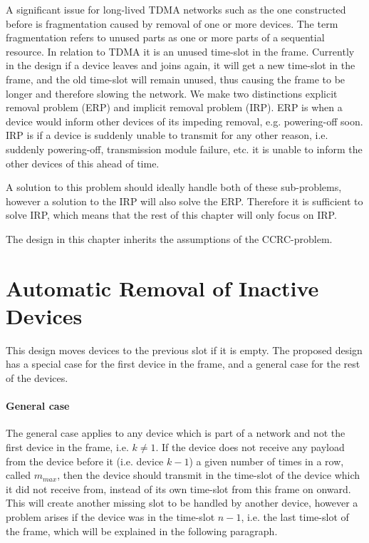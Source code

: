 A significant issue for long-lived TDMA networks such as the one constructed before is fragmentation caused by removal of one or more devices. 
The term fragmentation refers to unused parts as one or more parts of a sequential resource. 
In relation to TDMA it is an unused time-slot in the frame. 
Currently in the design if a device leaves and joins again, it will get a new time-slot in the frame, and the old time-slot will remain unused, thus causing the frame to be longer and therefore slowing the network.
We make two distinctions explicit removal problem (ERP) and implicit removal problem (IRP).
ERP is when a device would inform other devices of its impeding removal, e.g. powering-off soon. 
IRP is if a device is suddenly unable to transmit for any other reason, i.e. suddenly powering-off, transmission module failure, etc. it is unable to inform the other devices of this ahead of time. 

A solution to this problem should ideally handle both of these sub-problems, however a solution to the IRP will also solve the ERP.
Therefore it is sufficient to solve IRP, which means that the rest of this chapter will only focus on IRP.  

The design in this chapter inherits the assumptions of the CCRC-problem. 

\section{Automatic Removal of Inactive Devices}
This design moves devices to the previous slot if it is empty. 
The proposed design has a special case for the first device in the frame, and a general case for the rest of the devices.

\paragraph{General case}
The general case applies to any device which is part of a network and not the first device in the frame, i.e. $k \neq 1$.
If the device does not receive any payload from the device before it (i.e. device $k - 1$) a given number of times in a row, called $m_{max}$, then the device should transmit in the time-slot of the device which it did not receive from, instead of its own time-slot from this frame on onward. 
This will create another missing slot to be handled by another device, however a problem arises if the device was in the time-slot $n - 1$, i.e. the last time-slot of the frame, which will be explained in the following paragraph.

